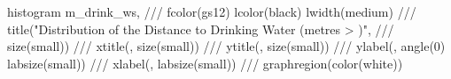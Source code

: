 histogram m_drink_ws, ///
fcolor(gs12) lcolor(black) lwidth(medium) ///
title("Distribution of the Distance to Drinking Water (metres
> )", ///
          size(small)) ///
xtitle(, size(small)) ///                               
ytitle(, size(small)) ///                               
ylabel(, angle(0) labsize(small)) ///
xlabel(, labsize(small)) ///
graphregion(color(white))                               
